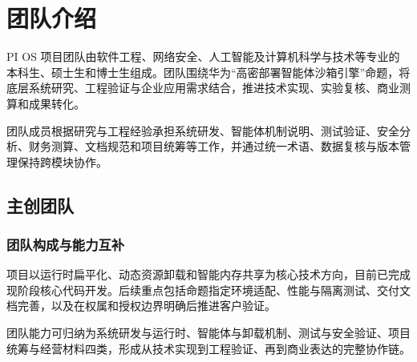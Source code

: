 \chapter{团队介绍}
PI OS 项目团队由软件工程、网络安全、人工智能及计算机科学与技术等专业的本科生、硕士生和博士生组成。团队围绕华为“高密部署智能体沙箱引擎”命题，将底层系统研究、工程验证与企业应用需求结合，推进技术实现、实验复核、商业测算和成果转化。

团队成员根据研究与工程经验承担系统研发、智能体机制说明、测试验证、安全分析、财务测算、文档规范和项目统筹等工作，并通过统一术语、数据复核与版本管理保持跨模块协作。

\section{主创团队}\label{sec:8.1}
\subsection{团队构成与能力互补}\label{sec:8.1.1}
项目以运行时扁平化、动态资源卸载和智能内存共享为核心技术方向，目前已完成现阶段核心代码开发。后续重点包括命题指定环境适配、性能与隔离测试、交付文档完善，以及在权属和授权边界明确后推进客户验证。

团队能力可归纳为系统研发与运行时、智能体与卸载机制、测试与安全验证、项目统筹与经营材料四类，形成从技术实现到工程验证、再到商业表达的完整协作链。

